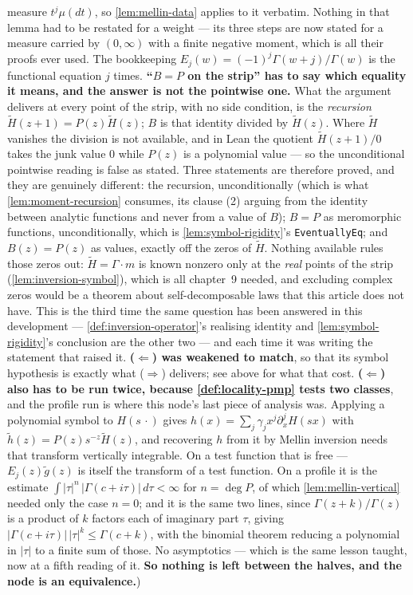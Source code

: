 \begin{lemma}[covariant local = polynomial symbol]
{measure $t^j\mu(dt)$, so \ref{lem:mellin-data} applies to it verbatim. Nothing in that lemma had
to be restated for a weight --- its three steps are now stated for a measure carried by
$(0,\infty)$ with a finite negative moment, which is all their proofs ever used. The bookkeeping
$E_j(w) = (-1)^j\Gamma(w+j)/\Gamma(w)$ is the functional equation $j$ times.
\textbf{``$B = P$ on the strip'' has to say which equality it means, and the answer is not the
pointwise one.} What the argument delivers at every point of the strip, with no side condition, is
the \emph{recursion} $\tilde H(z+1) = P(z)\tilde H(z)$; $B$ is that identity divided by
$\tilde H(z)$. Where $\tilde H$ vanishes the division is not available, and in Lean the quotient
$\tilde H(z+1)/0$ takes the junk value $0$ while $P(z)$ is a polynomial value --- so the
unconditional pointwise reading is false as stated. Three statements are therefore proved, and
they are genuinely different: the recursion, unconditionally (which is what
\ref{lem:moment-recursion} consumes, its clause (2) arguing from the identity between analytic
functions and never from a value of $B$); $B = P$ as meromorphic functions, unconditionally,
which is \ref{lem:symbol-rigidity}'s \texttt{EventuallyEq}; and $B(z) = P(z)$ as values, exactly
off the zeros of $\tilde H$. Nothing available rules those zeros out: $\tilde H = \Gamma\cdot m$
is known nonzero only at the \emph{real} points of the strip (\ref{lem:inversion-symbol}), which
is all chapter~9 needed, and excluding complex zeros would be a theorem about self-decomposable
laws that this article does not have. This is the third time the same question has been answered
in this development --- \ref{def:inversion-operator}'s realising identity and
\ref{lem:symbol-rigidity}'s conclusion are the other two --- and each time it was writing the
statement that raised it.
\textbf{($\Leftarrow$) was weakened to match}, so that its symbol hypothesis is exactly what
($\Rightarrow$) delivers; see above for what that cost.
\textbf{($\Leftarrow$) also has to be run twice, because \ref{def:locality-pmp} tests two
classes}, and the profile run is where this node's last piece of analysis was. Applying a
polynomial symbol to $H(s\,\cdot)$ gives $h(x) = \sum_j \gamma_j x^j\partial_x^j H(sx)$ with
$\tilde h(z) = P(z)s^{-z}\tilde H(z)$, and recovering $h$ from it by Mellin inversion needs that
transform vertically integrable. On a test function that is free --- $E_j(z)\tilde g(z)$ is itself
the transform of a test function. On a profile it is the estimate
$\int |\tau|^{n}\,|\Gamma(c+i\tau)|\,d\tau < \infty$ for $n = \deg P$, of which
\ref{lem:mellin-vertical} needed only the case $n = 0$; and it is the same two lines, since
$\Gamma(z+k)/\Gamma(z)$ is a product of $k$ factors each of imaginary part $\tau$, giving
$|\Gamma(c+i\tau)|\,|\tau|^k \le \Gamma(c+k)$, with the binomial theorem reducing a polynomial in
$|\tau|$ to a finite sum of those. No asymptotics --- which is the same lesson 
taught, now at a fifth reading of it.
\textbf{So nothing is left between the halves, and the node is an equivalence.})}
\end{lemma}

